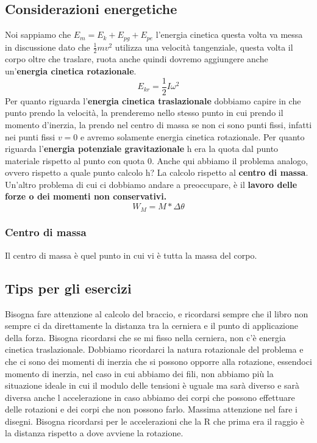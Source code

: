 \documentclass{article}
\numberwithin{equation}{subsection}
\begin{document}
\subsection{Considerazioni energetiche}
Noi sappiamo che $E_m=E_k+E_{pg}+E_{pe}$ l'energia cinetica questa volta va messa in discussione dato che $\frac{1}{2}mv^2$ utilizza una velocità tangenziale, questa volta il corpo oltre che traslare, ruota anche quindi dovremo aggiungere anche un'\textbf{energia cinetica rotazionale}. 
\begin{equation}
    E_{kr}=\frac{1}{2}I\omega^2
\end{equation}
Per quanto riguarda l'\textbf{energia cinetica traslazionale} dobbiamo capire in che punto prendo la velocità, la prenderemo nello stesso punto in cui prendo il momento d'inerzia, la prendo nel centro di massa se non ci sono punti fissi, infatti nei punti fissi $v=0$ e avremo solamente energia cinetica rotazionale. Per quanto riguarda l'\textbf{energia potenziale gravitazionale} h era la quota dal punto materiale rispetto al punto con quota 0. Anche qui abbiamo il problema analogo, ovvero rispetto a quale punto calcolo h? La calcolo rispetto al \textbf{centro di massa}. Un'altro problema di cui ci dobbiamo andare a preoccupare, è il \textbf{lavoro delle forze o dei momenti non conservativi.}
\begin{equation}
    W_M=M*\Delta\theta
\end{equation}
\subsubsection{Centro di massa}
Il centro di massa è quel punto in cui vi è tutta la massa del corpo.
\subsection{Tips per gli esercizi}
Bisogna fare attenzione al calcolo del braccio, e ricordarsi sempre che il libro non sempre ci da direttamente la distanza tra la cerniera e il punto di applicazione della forza. Bisogna ricordarsi che se mi fisso nella cerniera, non c'è energia cinetica traslazionale. Dobbiamo ricordarci la natura rotazionale del problema e che ci sono dei momenti di inerzia che si possono opporre alla rotazione, essendoci momento di inerzia, nel caso in cui abbiamo dei fili, non abbiamo più la situazione ideale in cui il modulo delle tensioni è uguale ma sarà diverso e sarà diversa anche l accelerazione in caso abbiamo dei corpi che possono effettuare delle rotazioni e dei corpi che non possono farlo. Massima attenzione nel fare i disegni. Bisogna ricordarsi per le accelerazioni che la R che prima era il raggio è la distanza rispetto a dove avviene la rotazione.
\end{document}
